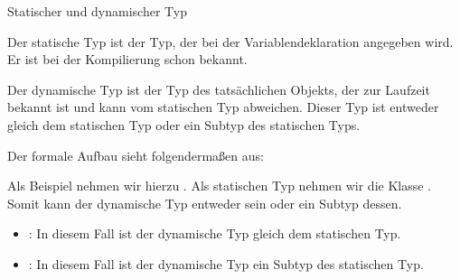 \documentclass{../tuda-exercise}
\begin{document}
\begin{task}[credit=\stars{2}{3}]{Statischer und dynamischer Typ}
\begin{solution}
      \begin{note}[title=Information:]

        Der statische Typ ist der Typ, der bei der Variablendeklaration angegeben wird. Er ist
        bei der Kompilierung schon bekannt.

        \br

        Der dynamische Typ ist der Typ des tatsächlichen Objekts, der zur Laufzeit bekannt ist
        und kann vom statischen Typ abweichen. Dieser Typ ist entweder gleich dem statischen Typ
        oder ein Subtyp des statischen Typs.

        \br

        Der formale Aufbau sieht folgendermaßen aus:

        \begin{center}
        \end{center}

        Als Beispiel nehmen wir hierzu . Als statischen Typ nehmen wir die
        Klasse . Somit kann der dynamische Typ entweder  sein
        oder ein Subtyp dessen.

        \begin{itemize}
          \item {}: In diesem Fall ist der dynamische
          Typ gleich dem
          statischen Typ.
          \item {}: In diesem Fall ist der
          dynamische Typ ein Subtyp
          des statischen Typ.
        \end{itemize}
      \end{note}
    \end{solution}
  \end{task}

  \clearpage
\end{document}

